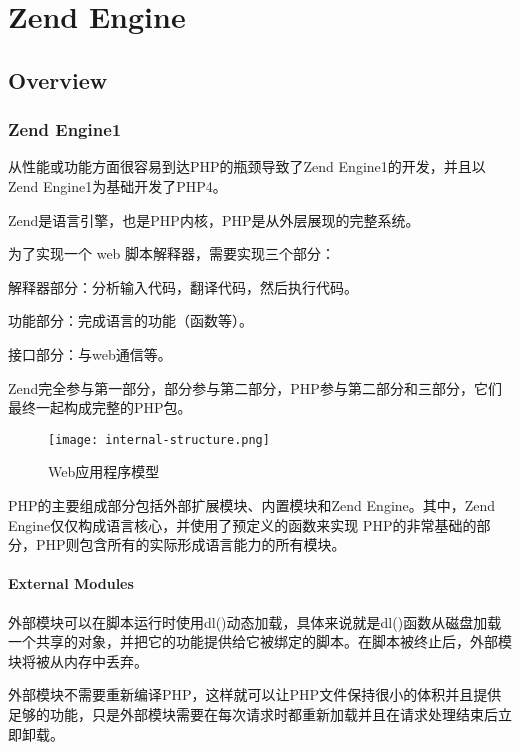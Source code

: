 \part{Zend Engine}


\chapter{Overview}


\section{Zend Engine1}

从性能或功能方面很容易到达PHP的瓶颈导致了Zend Engine1的开发，并且以Zend Engine1为基础开发了PHP4。

Zend是语言引擎，也是PHP内核，PHP是从外层展现的完整系统。

为了实现一个 web 脚本解释器，需要实现三个部分：

\begin{compactenum}
\item 解释器部分：分析输入代码，翻译代码，然后执行代码。
\item 功能部分：完成语言的功能（函数等）。
\item 接口部分：与web通信等。
\end{compactenum}

Zend完全参与第一部分，部分参与第二部分，PHP参与第二部分和三部分，它们最终一起构成完整的PHP包。

\begin{figure}[htbp]
\centering
\texttt{[image: internal-structure.png]}
\caption{Web应用程序模型}
\end{figure}

PHP的主要组成部分包括外部扩展模块、内置模块和Zend Engine。其中，Zend Engine仅仅构成语言核心，并使用了预定义的函数来实现 PHP的非常基础的部分，PHP则包含所有的实际形成语言能力的所有模块。

\subsection{External Modules}

外部模块可以在脚本运行时使用dl()动态加载，具体来说就是dl()函数从磁盘加载一个共享的对象，并把它的功能提供给它被绑定的脚本。在脚本被终止后，外部模块将被从内存中丢弃。

外部模块不需要重新编译PHP，这样就可以让PHP文件保持很小的体积并且提供足够的功能，只是外部模块需要在每次请求时都重新加载并且在请求处理结束后立即卸载。


